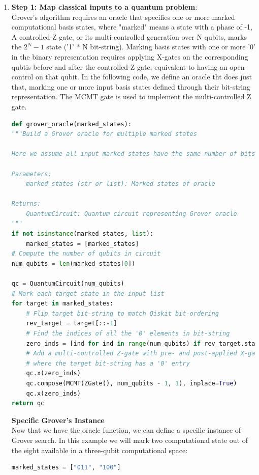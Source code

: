 \documentclass[12pt, oneside]{book}
\theoremstyle{definition}
\theoremstyle{definition}
\theoremstyle{remark}
\begin{document}
\begin{enumerate}
    \item \textbf{Step 1: Map classical inputs to a quantum problem}: \\
    Grover's algorithm requires an oracle that specifies one or more marked computational basis states, where "marked" means a state with a phase of -1, A controlled-Z gate, or its multi-controlled generation over N qubits, marks the $2^N-1$ state ('1' * N bit-string). Marking basis states with one or more '0' in the binary representation requires applying X-gates on the corresponding qubtis before and after the controlled-Z gate; equivalent to having an open-control on that qubit. In the following code, we define an oracle tht does just that, marking one or more input basis states defined through their bit-string representation. The MCMT gate is used to implement the multi-controlled Z gate.
    \begin{lstlisting}[language=Python]
def grover_oracle(marked_states):
"""Build a Grover oracle for multiple marked states

Here we assume all input marked states have the same number of bits

Parameters:
    marked_states (str or list): Marked states of oracle

Returns:
    QuantumCircuit: Quantum circuit representing Grover oracle
"""
if not isinstance(marked_states, list):
    marked_states = [marked_states]
# Compute the number of qubits in circuit
num_qubits = len(marked_states[0])

qc = QuantumCircuit(num_qubits)
# Mark each target state in the input list
for target in marked_states:
    # Flip target bit-string to match Qiskit bit-ordering
    rev_target = target[::-1]
    # Find the indices of all the '0' elements in bit-string
    zero_inds = [ind for ind in range(num_qubits) if rev_target.startswith("0", ind)]
    # Add a multi-controlled Z-gate with pre- and post-applied X-gates (open-controls)
    # where the target bit-string has a '0' entry
    qc.x(zero_inds)
    qc.compose(MCMT(ZGate(), num_qubits - 1, 1), inplace=True)
    qc.x(zero_inds)
return qc
    \end{lstlisting}
    \textbf{Specific Grover's Instance}\\
Now that we have the oracle function, we can define a specific instance of Grover search. In this example we will mark two computational state out of the eight available in a three-qubit computational space:
\begin{lstlisting}[language=Python]
marked_states = ["011", "100"]


\end{lstlisting}
\end{enumerate}
\end{document}
